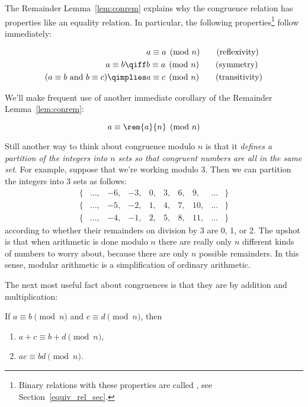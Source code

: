 The Remainder Lemma~\ref{lem:conrem} explains why the congruence
relation has properties like an equality relation.  In particular, the
following properties\footnote{Binary relations with these properties
  are called \emph{}, see
  Section~\ref{equiv_rel_sec}.}  follow immediately:
\begin{lemma}\label{mod_equiv_rel_lem} \mbox{}
\begin{align}
                 & a \equiv a \pmod{n}\tag{reflexivity}\\ a \equiv b
  \qiff & b \equiv a \pmod{n} \tag{symmetry}\\ (a \equiv b \text{ and
  } b \equiv c) \qimplies & a \equiv c \pmod{n} \tag{transitivity}
\end{align}
\end{lemma}

We'll make frequent use of another immediate corollary of the
Remainder Lemma~\ref{lem:conrem}:
\begin{corollary}\label{aran}
\[
a \equiv \rem{a}{n} \pmod{n}
\]
\end{corollary}

Still another way to think about congruence modulo $n$ is that it
\emph{defines a partition of the integers into $n$ sets so that
  congruent numbers are all in the same set}.  For example, suppose
that we're working modulo 3.  Then we can partition the integers into
3 sets as follows:
\[
\begin{array}{cccccccccc}
\{ & \dots, & -6, & -3, & 0, & 3, & 6, & 9, & \dots & \} \\ \{ &
\dots, & -5, & -2, & 1, & 4, & 7, & 10, & \dots & \} \\ \{ & \dots, &
-4, & -1, & 2, & 5, & 8, & 11, & \dots & \}
\end{array}
\]
according to whether their remainders on division by 3 are 0, 1, or 2.
The upshot is that when arithmetic is done modulo $n$ there are really
only $n$ different kinds of numbers to worry about, because there are
only $n$ possible remainders.  In this sense, modular arithmetic is a
simplification of ordinary arithmetic.\iffalse and thus is a good
reasoning tool.\fi

The next most useful fact about congruences is that they are
 by addition and multiplication:

\begin{lemma}[Congruence]\label{mod_congruence_lem}  If
$a \equiv b \pmod{n}$ and $c \equiv d \pmod{n}$, then
\begin{enumerate}
\item $a + c \equiv b + d \pmod{n}$,\label{mod_congruence_lem+}
\item $a c \equiv b d \pmod{n}$.\label{mod_congruence_lem*}
\end{enumerate}
\end{lemma}

